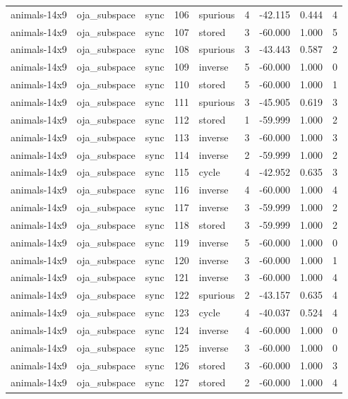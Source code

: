 \begin{tabular}{lllrlrrrr}
animals-14x9 & oja\_subspace & sync & 106 & spurious & 4 & -42.115 & 0.444 & 4 \\
animals-14x9 & oja\_subspace & sync & 107 & stored & 3 & -60.000 & 1.000 & 5 \\
animals-14x9 & oja\_subspace & sync & 108 & spurious & 3 & -43.443 & 0.587 & 2 \\
animals-14x9 & oja\_subspace & sync & 109 & inverse & 5 & -60.000 & 1.000 & 0 \\
animals-14x9 & oja\_subspace & sync & 110 & stored & 5 & -60.000 & 1.000 & 1 \\
animals-14x9 & oja\_subspace & sync & 111 & spurious & 3 & -45.905 & 0.619 & 3 \\
animals-14x9 & oja\_subspace & sync & 112 & stored & 1 & -59.999 & 1.000 & 2 \\
animals-14x9 & oja\_subspace & sync & 113 & inverse & 3 & -60.000 & 1.000 & 3 \\
animals-14x9 & oja\_subspace & sync & 114 & inverse & 2 & -59.999 & 1.000 & 2 \\
animals-14x9 & oja\_subspace & sync & 115 & cycle & 4 & -42.952 & 0.635 & 3 \\
animals-14x9 & oja\_subspace & sync & 116 & inverse & 4 & -60.000 & 1.000 & 4 \\
animals-14x9 & oja\_subspace & sync & 117 & inverse & 3 & -59.999 & 1.000 & 2 \\
animals-14x9 & oja\_subspace & sync & 118 & stored & 3 & -59.999 & 1.000 & 2 \\
animals-14x9 & oja\_subspace & sync & 119 & inverse & 5 & -60.000 & 1.000 & 0 \\
animals-14x9 & oja\_subspace & sync & 120 & inverse & 3 & -60.000 & 1.000 & 1 \\
animals-14x9 & oja\_subspace & sync & 121 & inverse & 3 & -60.000 & 1.000 & 4 \\
animals-14x9 & oja\_subspace & sync & 122 & spurious & 2 & -43.157 & 0.635 & 4 \\
animals-14x9 & oja\_subspace & sync & 123 & cycle & 4 & -40.037 & 0.524 & 4 \\
animals-14x9 & oja\_subspace & sync & 124 & inverse & 4 & -60.000 & 1.000 & 0 \\
animals-14x9 & oja\_subspace & sync & 125 & inverse & 3 & -60.000 & 1.000 & 0 \\
animals-14x9 & oja\_subspace & sync & 126 & stored & 3 & -60.000 & 1.000 & 3 \\
animals-14x9 & oja\_subspace & sync & 127 & stored & 2 & -60.000 & 1.000 & 4 \\

\end{tabular}
